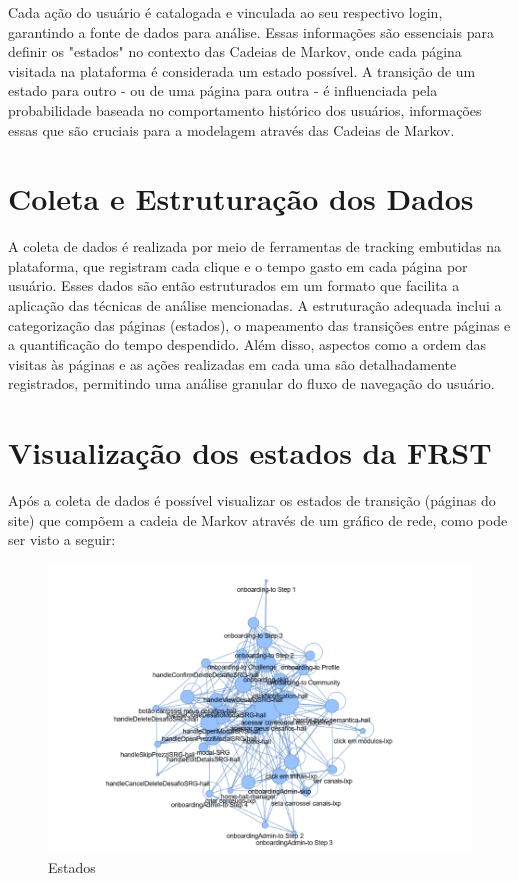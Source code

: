 Cada ação do usuário é catalogada e vinculada ao seu respectivo login, garantindo a fonte de dados para análise. Essas informações são essenciais para definir os "estados" no contexto das Cadeias de Markov, onde cada página visitada na plataforma é considerada um estado possível. A transição de um estado para outro - ou de uma página para outra - é influenciada pela probabilidade baseada no comportamento histórico dos usuários, informações essas que são cruciais para a modelagem através das Cadeias de Markov.

\section{Coleta e Estruturação dos Dados}


A coleta de dados é realizada por meio de ferramentas de tracking embutidas na plataforma, que registram cada clique e o tempo gasto em cada página por usuário. Esses dados são então estruturados em um formato que facilita a aplicação das técnicas de análise mencionadas. A estruturação adequada inclui a categorização das páginas (estados), o mapeamento das transições entre páginas e a quantificação do tempo despendido. Além disso, aspectos como a ordem das visitas às páginas e as ações realizadas em cada uma são detalhadamente registrados, permitindo uma análise granular do fluxo de navegação do usuário.

\section{Visualização dos estados da FRST}

	Após a coleta de dados é possível visualizar os estados de transição (páginas do site) que compõem a cadeia de Markov através de um gráfico de rede, como pode ser visto a seguir: 

\begin{figure}
    \centering
    \includegraphics[width = .9\linewidth]{relatorios/frst/figuras/estados1.png}
        \caption{Estados}

    \label{fig:mapa2}
\end{figure}

